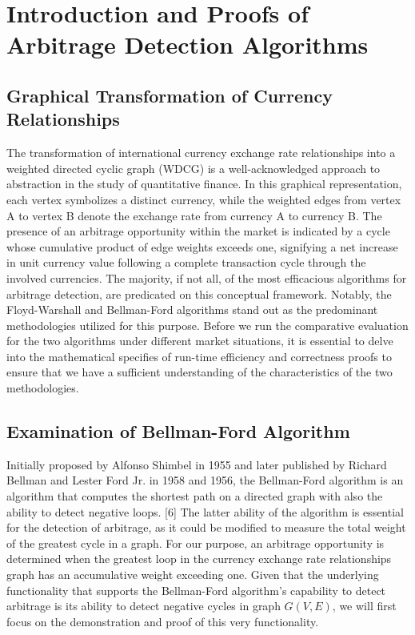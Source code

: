 \documentclass[12pt]{article}
\begin{document}
\section{Introduction and Proofs of Arbitrage Detection Algorithms}
\subsection{Graphical Transformation of Currency Relationships}
The transformation of international currency exchange rate relationships into a weighted directed cyclic graph (WDCG) is a well-acknowledged approach to abstraction in the study of quantitative finance. In this graphical representation, each vertex symbolizes a distinct currency, while the weighted edges from vertex A to vertex B denote the exchange rate from currency A to currency B. The presence of an arbitrage opportunity within the market is indicated by a cycle whose cumulative product of edge weights exceeds one, signifying a net increase in unit currency value following a complete transaction cycle through the involved currencies. The majority, if not all, of the most efficacious algorithms for arbitrage detection, are predicated on this conceptual framework. Notably, the Floyd-Warshall and Bellman-Ford algorithms stand out as the predominant methodologies utilized for this purpose. Before we run the comparative evaluation for the two algorithms under different market situations, it is essential to delve into the mathematical specifies of run-time efficiency and correctness proofs to ensure that we have a sufficient understanding of the characteristics of the two methodologies.

\subsection{Examination of Bellman-Ford Algorithm}

Initially proposed by Alfonso Shimbel in 1955 and later published by Richard Bellman and Lester Ford Jr. in 1958 and 1956, the Bellman-Ford algorithm is an algorithm that computes the shortest path on a directed graph with also the ability to detect negative loops. [6] The latter ability of the algorithm is essential for the detection of arbitrage, as it could be modified to measure the total weight of the greatest cycle in a graph. For our purpose, an arbitrage opportunity is determined when the greatest loop in the currency exchange rate relationships graph has an accumulative weight exceeding one. Given that the underlying functionality that supports the Bellman-Ford algorithm's capability to detect arbitrage is its ability to detect negative cycles in graph $G(V, E)$, we will first focus on the demonstration and proof of this very functionality.
\end{document}
